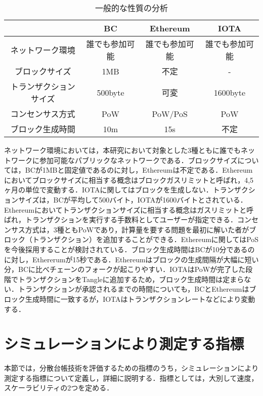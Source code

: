 \documentclass[japanese, macos]{KU2}
\begin{document}
\begin{table*}[htbp]
    \begin{center}
    \begin{tabular}{|c||c|c|c|} \hline
       & BC & Ethereum & IOTA  \\ \hline \hline
       ネットワーク環境 & 誰でも参加可能 & 誰でも参加可能 &  誰でも参加可能\\ \hline
       ブロックサイズ & 1MB & 不定 & - \\ \hline
       トランザクションサイズ & 500byte & 可変 & 1600byte \\ \hline
       コンセンサス方式 & PoW & PoW/PoS & PoW \\ \hline
       ブロック生成時間 & 10m & 15s & 不定 \\ \hline
    \end{tabular}
    \end{center}
    \caption{一般的な性質の分析 \label{tb:qualitive}}
\end{table*}

ネットワーク環境においては，本研究において対象とした3種ともに誰でもネットワークに参加可能なパブリックなネットワークである．ブロックサイズについては，BCが1MBと固定値であるのに対し，Ethereumは不定である．Ethereumにおいてブロックサイズに相当する概念はブロックガスリミットと呼ばれ，4,5ヶ月の単位で変動する．IOTAに関してはブロックを生成しない．トランザクションサイズは，BCが平均して500バイト\cite{croman2016scaling}，IOTAが1600バイトとされている．Ethereumにおいてトランザクションサイズに相当する概念はガスリミットと呼ばれ，トランザクションを実行する手数料としてユーザーが指定できる．コンセンサス方式は，3種ともPoWであり，計算量を要する問題を最初に解いた者がブロック（トランザクション）を追加することができる．Ethereumに関してはPoSを今後採用することが検討されている．ブロック生成時間はBCが10分であるのに対し，Ethererumが15秒である．Ethereumはブロックの生成間隔が大幅に短い分，BCに比べチェーンのフォークが起こりやすい．IOTAはPoWが完了した段階でトランザクションをTangleに追加するため，ブロック生成時間は定まらない．トランザクションが承認されるまでの時間についても，BCとEthereumはブロック生成時間に一致するが，IOTAはトランザクションレートなどにより変動する．

\section{シミュレーションにより測定する指標}
本節では，分散台帳技術を評価するための指標のうち，シミュレーションにより測定する指標について定義し，詳細に説明する．指標としては，大別して速度，スケーラビリティの2つを定める．
\end{document}
